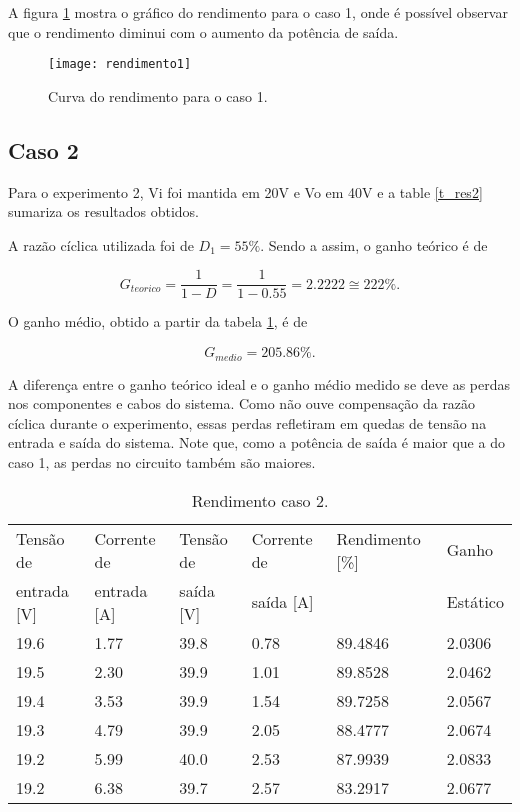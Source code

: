 	A figura \ref{f_rend1} mostra o gráfico do rendimento para o caso 1, onde é possível observar que o rendimento diminui com o aumento da potência de saída.
	
	\begin{figure}[H]
		\centering
		\caption{Curva do rendimento para o caso 1.}
		\texttt{[image: rendimento1]}
		\label{f_rend1}
	\end{figure}
	
\subsection{Caso 2}

	Para o experimento 2, Vi foi mantida em 20V e Vo em 40V e a table \ref{t_res2} sumariza os resultados obtidos.
	
	A razão cíclica utilizada foi de $D_1 = 55 \%$. Sendo a assim, o ganho teórico é de
	
	\[
	G_{teorico} = \frac{1}{1-D} = \frac{1}{1-0.55} = 2.2222 \cong 222 \%.
	\]
	
	O ganho médio, obtido a partir da tabela \ref{t_rend2}, é de
	
	\[
	G_{medio} = 205.86 \%.
	\]
	
	A diferença entre o ganho teórico ideal e o ganho médio medido se deve as perdas nos componentes e cabos do sistema. Como não ouve compensação da razão cíclica durante o experimento, essas perdas refletiram em quedas de tensão na entrada e saída do sistema. Note que, como a potência de saída é maior que a do caso 1, as perdas no circuito também são maiores.
	
	\begin{small}
		\begin{table}[H]
			\begin{center}
				\caption{Rendimento caso 2.}
				\begin{tabular}{l|l|l|l|l|l}
					\hline
					Tensão de   &  Corrente de 	& Tensão de & Corrente de	& Rendimento [\%] 	& Ganho    	\\
					entrada [V] &  entrada [A] 	& saída [V] & saída [A]  	&                 	& Estático 	\\
					\hline
					19.6 		& 1.77			& 39.8		& 0.78			& 89.4846			& 2.0306	\\
					\hline
					19.5		& 2.30			& 39.9		& 1.01			& 89.8528			& 2.0462	\\
					\hline
					19.4		& 3.53			& 39.9		& 1.54			& 89.7258			& 2.0567	\\
					\hline
					19.3		& 4.79			& 39.9		& 2.05			& 88.4777			& 2.0674	\\
					\hline
					19.2		& 5.99			& 40.0		& 2.53			& 87.9939			& 2.0833	\\
					\hline
					19.2		& 6.38			& 39.7		& 2.57			& 83.2917			& 2.0677	\\
				\end{tabular}
				\label{t_rend2}
			\end{center}
		\end{table}
	\end{small}
	
